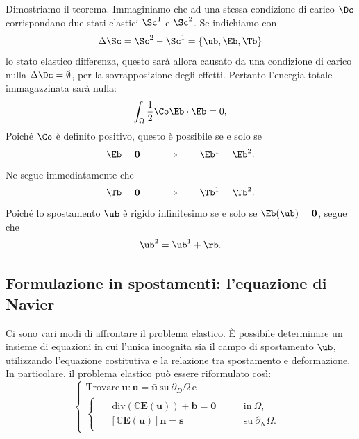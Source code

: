 Dimostriamo il teorema. Immaginiamo che ad una stessa condizione di carico $\Dc$ corrispondano due stati elastici $\Sc^1$ e $\Sc^2$. Se indichiamo con
\begin{equation}
\Delta \Sc=\Sc^2-\Sc^1=\{\ub, \Eb, \Tb\}
\end{equation}
lo stato elastico differenza, questo sarà allora causato da una condizione di carico nulla $\Delta\Dc=\emptyset$, per la sovrapposizione degli effetti. Pertanto l'energia totale 
immagazzinata sarà nulla:
\begin{equation}
\int_{\Omega}\frac{1}{2}\Co \Eb \cdot \Eb=0,
\end{equation}
Poiché $\Co$ è definito positivo, questo è possibile se e solo se 
\begin{equation}
\Eb=\mathbf{0}  \qquad \Longrightarrow\qquad \Eb^1=\Eb^2.
\end{equation}
Ne segue immediatamente che 
\begin{equation}
\Tb=\mathbf{0} \qquad \Longrightarrow\qquad \Tb^1=\Tb^2.
\end{equation}
Poiché lo spostamento $\ub$ è rigido infinitesimo se e solo se $\Eb(\ub)=\mathbf{0}$, segue che
\begin{equation}
\ub^2=\ub^1+\rb.
\end{equation}




\subsection{Formulazione in spostamenti: l'equazione di Navier}
Ci sono vari modi di affrontare il problema elastico. È possibile determinare un insieme di equazioni in cui l'unica incognita sia il campo di spostamento $\ub$, utilizzando l'equazione costitutiva e la relazione tra spostamento e deformazione. In particolare, il problema elastico può essere riformulato così:
\begin{equation}
	\begin{cases}
		\mathrm{Trovare~}\mathbf{u}:\mathbf{u}=\bar{\mathbf{u}}\mathrm{~su~}\partial_D\Omega\mathrm{~e}\\
		\begin{cases}
			\begin{aligned}
				&\mathrm{~div}(\mathbb{C}\mathbf{E}(\mathbf{u}))+\mathbf{b}=\mathbf{0}  \quad &&\mathrm{~in~}\Omega,\\
			&[\mathbb{C}\mathbf{E}(\mathbf{u})]\mathbf{n}=\mathbf{s} &&\mathrm{~su~}\partial_N\Omega.
			\end{aligned}
	\end{cases}
		\end{cases}
\end{equation}

